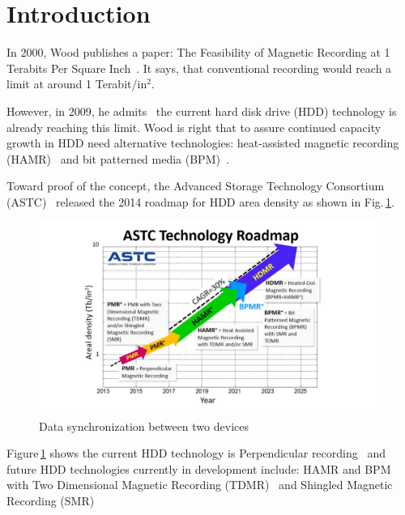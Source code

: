 \section{Introduction}
In 2000, Wood publishes a paper: The Feasibility of Magnetic Recording at 1 Terabits Per Square Inch~\cite{Wood2000}. It says, that conventional recording would reach a limit at around 1 Terabit/in$^2$.

However, in 2009, he admits~\cite{Wood2009} the current hard disk drive (HDD) technology is already reaching this limit. Wood is right that to assure continued capacity growth in HDD need alternative technologies: heat-assisted magnetic recording (HAMR)~\cite{Rottmeyer} and bit patterned media (BPM)~\cite{Terris}. 

Toward proof of the concept, the Advanced Storage Technology Consortium (ASTC)~\cite{ASTC} released the 2014 roadmap for HDD area density as shown in Fig.\,\ref{fig_astc}.

\begin{figure}[!hbt]
\includegraphics[height=0.25\textheight]{ASTC}
\caption{Data synchronization between two devices}
\label{fig_astc}
\end{figure}

Figure\,\ref{fig_astc} shows the current HDD technology is Perpendicular recording~\cite{HGST} and future HDD technologies currently in development include: HAMR and BPM with Two Dimensional Magnetic Recording (TDMR)~\cite{Krishnan} and Shingled Magnetic Recording (SMR)~\cite{Gibson}
